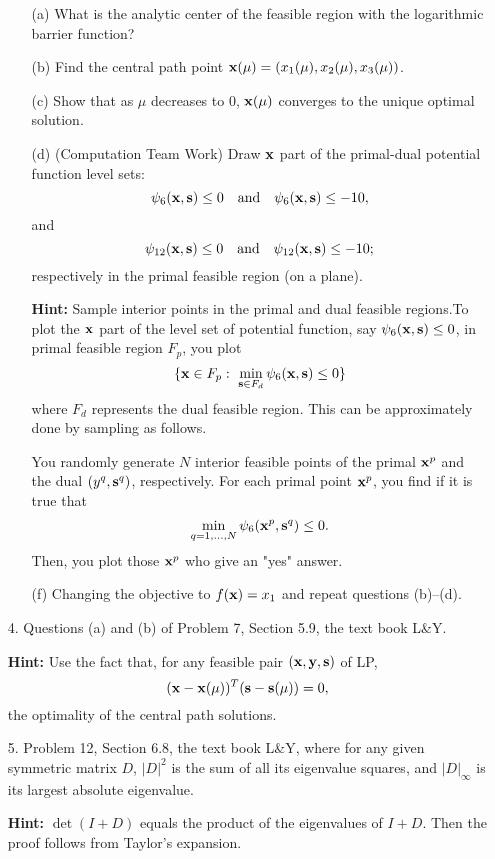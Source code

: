 \documentclass[12pt,letterpaper]{article}
\newcommand\x{{\bf x}}
\newcommand\y{{\bf y}}
\newcommand\s{{\bf s}}
\begin{document}
\begin{enumerate}
\begin{itemize}
\item[(a)] What is the analytic center of the feasible region with the logarithmic barrier function?

\item[(b)] Find the central path point $\x(\mu)=(x_1(\mu),x_2(\mu),x_3(\mu))$.

\item[(c)] Show that as $\mu$ decreases to $0$, $\x(\mu)$ converges to the unique optimal solution.

\item[(d)] (Computation Team Work) Draw $\x$ part of the primal-dual potential function level sets:
\[\psi_{6}(\x,\s)\le 0 \quad\mbox{and}\quad \psi_{6}(\x,\s)\le -10,\]
and
\[\psi_{12}(\x,\s)\le 0 \quad\mbox{and}\quad \psi_{12}(\x,\s)\le -10;\]
respectively in the primal feasible region (on a plane).

{\bf Hint:} Sample interior points in the primal and dual feasible regions.To plot the $\x$ part of the level set of potential function, say $\psi_{6}(\x,\s)\le 0$,
in primal feasible region $F_p$, you plot
\[\{\x\in F_p:\ \min_{\s\in F_d}\psi_{6}(\x,\s)\le 0\}\]
where $F_d$ represents the dual feasible region. This can be approximately done by sampling as follows.

You randomly generate $N$ interior feasible points of the primal $\x^p$ and the dual $(y^q,\s^q)$, respectively. For 
each primal point $\x^p$, you find if it is true that
\[\min_{q=1,...,N}\psi_{6}(\x^p,\s^q)\le 0.\]
Then, you plot those $\x^p$ who give an "yes" answer.

\item[(f)] Changing the objective to $f(\x)=x_1$ and repeat questions (b)--(d).
\end{itemize}

\item[4.] Questions (a) and (b) of Problem 7, Section 5.9, the text book L\&Y.

{\bf Hint:} Use the fact that, for any feasible pair $(\x,\y,\s)$ of LP,
\[(\x-\x(\mu))^T(\s-\s(\mu))=0,\]
the optimality of the central path solutions.

\item[5.] Problem 12, Section 6.8, the text book L\&Y, where for any given symmetric matrix $D$, $|D|^2$ is the sum of all its eigenvalue squares, and  $|D|_{\infty}$ is its largest absolute eigenvalue.

{\bf Hint:} $\det(I+D)$ equals the product of the eigenvalues of $I+D$. Then the proof follows from Taylor's expansion.


\end{enumerate}
\end{document}

